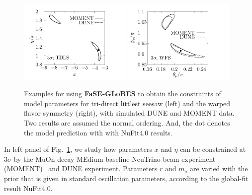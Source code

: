 \documentclass[aps,prd,nofootinbib,preprint]{revtex4}
\begin{document}
\begin{figure}[!h]
 \centering
\includegraphics[width=0.48\textwidth]{Figs/x_eta.pdf}
 \includegraphics[width=0.48\textwidth]{Figs/theta_phi.pdf}
  \caption{\label{fig:constraint}Examples for using \textbf{FaSE-GLoBES} to obtain the constraints of model parameters for tri-direct littlest seesaw (left) and the warped flavor symmetry (right), with simulated DUNE and MOMENT data. Two results are assumed the normal ordering. And, the dot denotes the model prediction with with NuFit4.0 results.}
\end{figure}

In left panel of Fig.~\ref{fig:constraint}, we study how parameters $x$ and $\eta$ can be constrained at $3\sigma$ by the MuOn-decay MEdium baseline NeuTrino beam experiment (MOMENT)~\cite{Cao:2014bea} and DUNE experiment. 
Parameters $r$ and $m_a$ are varied with the prior that is given in standard oscillation parameters, according to the global-fit result NuFit4.0. 
\end{document}
